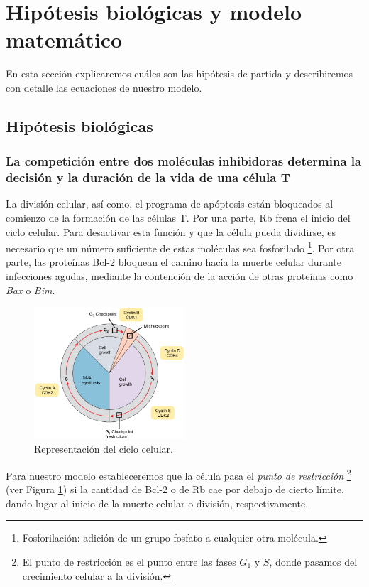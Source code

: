 \section{Hipótesis biológicas y modelo matemático}

En esta sección explicaremos cuáles son las hipótesis de partida y describiremos con detalle las ecuaciones de nuestro modelo. 

\subsection{Hipótesis biológicas} 

\subsubsection{La competición entre dos moléculas inhibidoras determina la decisión y la duración de la vida de una célula T}
\label{susubsec:hip_1}
	 
La división celular, así como, el programa de apóptosis están bloqueados al comienzo de la formación de las células T. Por una parte, Rb frena el inicio del ciclo celular. Para desactivar esta función y que la célula pueda dividirse, es necesario que un número suficiente de estas moléculas sea fosforilado \footnote{Fosforilación: adición de un grupo fosfato a cualquier otra molécula.}.  Por otra parte, las proteínas Bcl-2 bloquean el camino hacia la muerte celular durante infecciones agudas, mediante la contención de la acción de otras proteínas como \textit{Bax} o \textit{Bim}.


\begin{figure}[t]
	\centering
	\includegraphics[width=0.5\textwidth]{Cell_Cycle}
	\caption{Representación del ciclo celular.}
	\label{fig:ciclo celular}
\end{figure}

Para nuestro modelo estableceremos que la célula pasa el \textit{punto de restricción} \footnote{El punto de restricción es el punto entre las fases $G_{1}$ y $S$, donde pasamos del crecimiento celular a la división.} (ver Figura \ref{fig:ciclo celular}) si la cantidad de Bcl-2 o de Rb cae por debajo de cierto límite, dando lugar al inicio de la muerte celular o división, respectivamente. 

